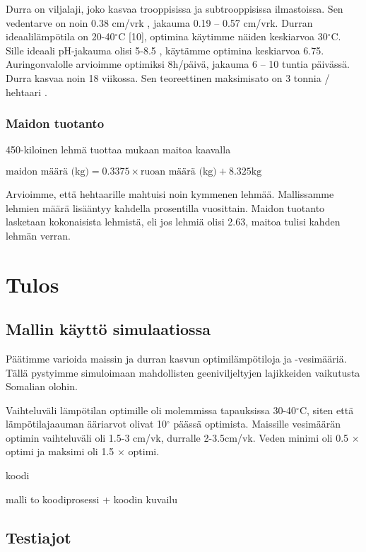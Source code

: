 \documentclass[12pt]{scrreprt}
\begin{document}
  Durra on viljalaji, joko kasvaa trooppisissa ja subtrooppisissa ilmastoissa.
  Sen vedentarve on noin 0.38 cm/vrk \cite{cropwater}, jakauma 0.19 –
  0.57 cm/vrk. Durran ideaalilämpötila on 20-40$^{\circ}$C [10], optimina
  käytimme näiden keskiarvoa 30$^{\circ}$C. Sille ideaali pH-jakauma olisi 5-8.5
  \cite{moench}, käytämme optimina keskiarvoa 6.75. Auringonvalolle arvioimme
  optimiksi 8h/päivä, jakauma 6 – 10 tuntia päivässä. Durra kasvaa noin 18
  viikossa. Sen teoreettinen maksimisato on 3 tonnia / hehtaari \cite{wylie}.

  \subsection{Maidon tuotanto}
  450-kiloinen lehmä tuottaa \cite{milk} mukaan maitoa kaavalla
  
  \begin{em}
  $ \text{maidon määrä (kg)} = 0.3375 \times \text{ruoan määrä (kg)}
  + 8.325\text{kg} $ \end{em}

  Arvioimme, että hehtaarille mahtuisi noin kymmenen lehmää. Mallissamme lehmien
  määrä lisääntyy kahdella prosentilla vuosittain. Maidon tuotanto lasketaan
  kokonaisista lehmistä, eli jos lehmiä olisi 2.63, maitoa tulisi kahden lehmän
  verran.

  \chapter{Tulos}

  \section{Mallin käyttö simulaatiossa}

  Päätimme varioida maissin ja durran kasvun optimilämpötiloja ja -vesimääriä.
  Tällä pystyimme simuloimaan mahdollisten geeniviljeltyjen lajikkeiden
  vaikutusta Somalian olohin.

  Vaihteluväli lämpötilan optimille oli molemmissa tapauksissa 30-40$^{\circ}$C,
  siten että lämpötilajaauman ääriarvot olivat 10$^{\circ}$ päässä optimista.
  Maissille vesimäärän optimin vaihteluväli oli 1.5-3 cm/vk, durralle
  2-3.5cm/vk. Veden minimi oli 0.5 $\times$ optimi ja maksimi oli 1.5 $\times$
  optimi.

  koodi

  malli to koodiprosessi + koodin kuvailu

  \section{Testiajot}
\end{document}
